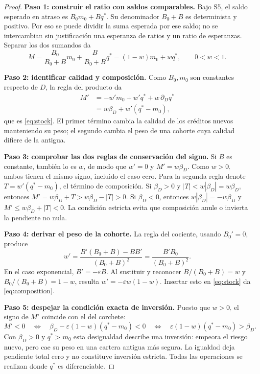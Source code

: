 \documentclass[11pt]{article}
\theoremstyle{definition}\newtheorem{assumption}{Supuesto}
\begin{document}
\begin{proof}
\textbf{Paso 1: construir el ratio con saldos comparables.}
Bajo S5, el saldo esperado en atraso es $B_0m_0+Bq^*$. Su denominador
$B_0+B$ es determinista y positivo. Por eso se puede dividir la suma esperada
por ese saldo; no se intercambian sin justificación una esperanza de ratios
y un ratio de esperanzas. Separar los dos sumandos da
\[
M=\frac{B_0}{B_0+B}m_0+\frac{B}{B_0+B}q^*
  =(1-w)m_0+wq^*,\qquad 0<w<1.
\]

\textbf{Paso 2: identificar calidad y composición.}
Como $B_0,m_0$ son constantes respecto de $D$, la regla del producto da
\begin{align*}
M'&=-w'm_0+w'q^*+w\,\partial_Dq^*\\
  &=w\beta_D+w'(q^*-m_0),
\end{align*}
que es \eqref{eq:stock}. El primer término cambia la calidad de los créditos
nuevos manteniendo su peso; el segundo cambia el peso de una cohorte cuya
calidad difiere de la antigua.

\textbf{Paso 3: comprobar las dos reglas de conservación del signo.}
Si $B$ es constante, también lo es $w$, de modo que $w'=0$ y
$M'=w\beta_D$. Como $w>0$, ambos tienen el mismo signo, incluido el caso cero.
Para la segunda regla denote $T=w'(q^*-m_0)$, el término de composición.
Si $\beta_D>0$ y $|T|<w|\beta_D|=w\beta_D$, entonces
$M'=w\beta_D+T>w\beta_D-|T|>0$. Si $\beta_D<0$, entonces
$w|\beta_D|=-w\beta_D$ y
$M'\le w\beta_D+|T|<0$. La condición estricta evita que composición
anule o invierta la pendiente no nula.

\textbf{Paso 4: derivar el peso de la cohorte.}
La regla del cociente, usando $B_0'=0$, produce
\[
w'=\frac{B'(B_0+B)-BB'}{(B_0+B)^2}
   =\frac{B'B_0}{(B_0+B)^2}.
\]
En el caso exponencial, $B'= -\varepsilon B$. Al sustituir y reconocer
$B/(B_0+B)=w$ y $B_0/(B_0+B)=1-w$, resulta
$w'=-\varepsilon w(1-w)$. Insertar esto en \eqref{eq:stock} da
\eqref{eq:composition}.

\textbf{Paso 5: despejar la condición exacta de inversión.}
Puesto que $w>0$, el signo de $M'$ coincide con el del corchete:
\[
M'<0\quad\Longleftrightarrow\quad
\beta_D-\varepsilon(1-w)(q^*-m_0)<0
\quad\Longleftrightarrow\quad
\varepsilon(1-w)(q^*-m_0)>\beta_D.
\]
Con $\beta_D>0$ y $q^*>m_0$ esta desigualdad describe una inversión: empeora
el riesgo nuevo, pero cae su peso en una cartera antigua más segura. La
igualdad deja pendiente total cero y no constituye inversión estricta.
Todas las operaciones se realizan donde $q^*$ es diferenciable.
\end{proof}
\end{document}
